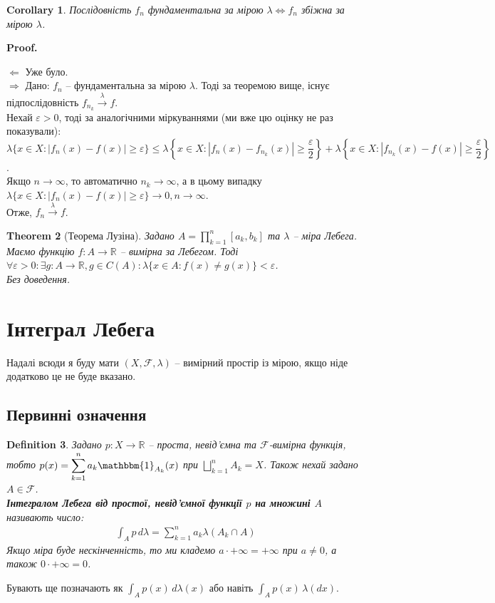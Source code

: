 \documentclass[a4paper, 10pt]{article}
\makeatletter
\def\rightproof{$\boxed{\Rightarrow}$ }
\def\leftproof{$\boxed{\Leftarrow}$ }
\theoremstyle{theoremdd}
\newtheorem{theorem}{Theorem}[subsection]
\newtheorem{definition}[theorem]{Definition}
\newtheorem{corollary}[theorem]{Corollary}
\newcommand\tomeasure[1]{\overset{{#1}}{\to}}
\renewenvironment{proof}[1][Proof.\\]{\par
\pushQED{\hfill \qed}%
\normalfont \topsep6\p@\@plus6\p@\relax
\trivlist
\item\relax
{\bfseries
#1\@addpunct{.}}\hspace\labelsep\ignorespaces
}{%
\popQED\endtrivlist\@endpefalse
}
\makeatother
\begin{document}
\begin{corollary}
Послідовність $f_n$ фундаментальна за мірою $\lambda \iff f_n$ збіжна за мірою $\lambda$.
\end{corollary}

\begin{proof}
\leftproof Уже було.
\bigskip \\
\rightproof Дано: $f_n$ -- фундаментальна за мірою $\lambda$. Тоді за теоремою вище, існує підпослідовність $f_{n_k} \tomeasure{\lambda} f$.\\
Нехай $\varepsilon >0$, тоді за аналогічними міркуваннями (ми вже цю оцінку не раз показували):\\
$\lambda\{x \in X: |f_n(x) - f(x)| \geq \varepsilon\} \leq \lambda\left\{x \in X: |f_n(x) - f_{n_k}(x)| \geq \dfrac{\varepsilon}{2}\right\} + \lambda\left\{x \in X: |f_{n_k}(x) - f(x)| \geq \dfrac{\varepsilon}{2}\right\}$.\\
Якщо $n \to \infty$, то автоматично $n_k \to \infty$, а в цьому випадку $\lambda\{x \in X: |f_n(x) - f(x)| \geq \varepsilon\} \to 0, n \to \infty$.\\
Отже, $f_n \tomeasure{\lambda} f$.
\end{proof}

\begin{theorem}[Теорема Лузіна]
Задано $A = \displaystyle\prod_{k=1}^n [a_k,b_k]$ та $\lambda$ -- міра Лебега. Маємо функцію $f \colon A \to \mathbb{R}$ -- вимірна за Лебегом. Тоді $\forall \varepsilon > 0: \exists g \colon A \to \mathbb{R}, g \in C(A): \lambda\{x \in A : f(x) \neq g(x)\} < \varepsilon$.\\
\textit{Без доведення.}
\end{theorem}
\newpage

\section{Інтеграл Лебега}
Надалі всюди я буду мати $(X,\mathcal{F},\lambda)$ -- вимірний простір із мірою, якщо ніде додатково це не буде вказано.

\subsection{Первинні означення}

\begin{definition}
Задано $p \colon X \to \mathbb{R}$ -- проста, невід'ємна та $\mathcal{F}$-вимірна функція, тобто $p(x) = \displaystyle\sum_{k=1}^n a_k \mathbbm{1}_{A_k}(x)$ при $\displaystyle\bigsqcup_{k=1}^n A_k = X$. Також нехай задано $A \in \mathcal{F}$.\\
\textbf{Інтегралом Лебега від простої, невід'ємної функції $p$ на множині $A$} називають число:
\begin{align*}
\int_A p\,d\lambda = \sum_{k=1}^n a_k \lambda(A_k \cap A)
\end{align*}
Якщо міра буде нескінченність, то ми кладемо $a \cdot +\infty = +\infty$ при $a \neq 0$, а також $0 \cdot +\infty = 0$.
\end{definition}
\noindent Бувають ще позначають як $\displaystyle\int_A p(x)\,d\lambda(x)$ або навіть $\displaystyle\int_A p(x)\,\lambda(dx)$.
\end{document}
